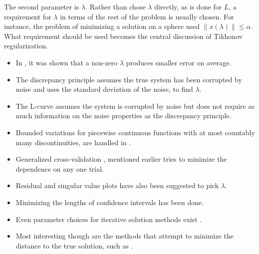 The second parameter is $\lambda$.  Rather than chose $\lambda$ directly, as is done for $L$, a requirement for $\lambda$ in terms of the rest of the problem is usually chosen.  For instance, the problem of minimizing a solution on a sphere used $\|x(\lambda)\|\leq\alpha$.  What requirement should be used becomes the central discussion of Tikhonov regularization.
\begin{itemize}
\item In , it was shown that a non-zero $\lambda$ produces smaller error on average.
\item The discrepancy principle  assumes the true system has been corrupted by noise and uses the standard deviation of the noise, to find $\lambda$.
\item The L-curve  assumes the system is corrupted by noise but does not require as much information on the noise properties as the discrepancy principle.
\item Bounded variations for piecewise continuous functions with at most countably many discontinuities, are handled in .
\item Generalized cross-validation , mentioned earlier tries to minimize the dependence on any one trial.
\item Residual and singular value plots have also been suggested  to pick $\lambda$.
\item Minimizing the lengths of confidence intervals  has been done.
\item Even parameter choices for iterative solution methods exist .
\item Most interesting though are the methods that attempt to minimize the distance to the true solution, such as .
\end{itemize}

